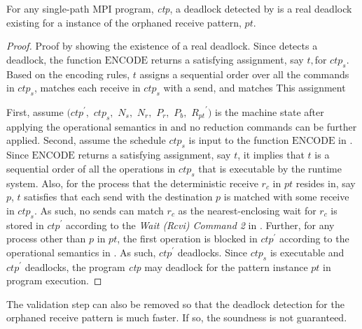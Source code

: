 \begin{lemma}
For any single-path MPI program, \textit{ctp}, a deadlock detected by  is a real deadlock existing for a instance of the orphaned receive pattern, $\mathit{pt}$. 
\label{lemma:mismatch}
\end{lemma}
\begin{proof}
Proof by showing the existence of a real deadlock. Since  detects a deadlock, the function $\mathrm{ENCODE}$ returns a satisfying assignment, say $\mathit{t}, $for $ctp_s$. Based on the encoding rules, $\mathit{t}$ assigns a sequential order over all the commands in $ctp_s$, matches each receive in $ctp_s$ with a send, and matches 
This assignment 

First, assume $(\mathit{ctp}^\prime,$ $\mathit{ctp}_s,$ $\mathit{N_s},$ $\mathit{N_r},$ $\mathit{P_r},$ $\mathit{P_b},$ $\mathit{R_{pt}}^\prime)$ is the machine state after applying the operational semantics in  and no reduction commands can be further applied. Second, assume the schedule $\mathit{ctp}_s$ is input to the function $\mathrm{ENCODE}$ in . Since $\mathrm{ENCODE}$ returns a satisfying assignment, say $\mathit{t}$, it implies that $\mathit{t}$ is a sequential order of all the operations in $\mathit{ctp}_s$ that is executable by the runtime system. Also, for the process that the deterministic receive $\mathit{r_c}$ in $\mathit{pt}$ resides in, say $\mathit{p}$, $\mathit{t}$ satisfies that each send with the destination $\mathit{p}$ is matched with some receive in $\mathit{ctp}_s$. As such, no sends can match $\mathit{r_c}$ as the nearest-enclosing wait for $\mathit{r_c}$ is stored in $\mathit{ctp}^\prime$ according to the \emph{Wait (Rcvi) Command 2} in . Further, for any process other than $\mathit{p}$ in $\mathit{pt}$, the first operation is blocked in $\mathit{ctp}^\prime$ according to the operational semantics in . As such, $\mathit{ctp}^\prime$ deadlocks. Since $\mathit{ctp}_s$ is executable and $\mathit{ctp}^\prime$ deadlocks, the program \textit{ctp} may deadlock for the pattern instance $\mathit{pt}$ in program execution. 
\end{proof}

The validation step can also be removed so that the deadlock detection for the orphaned receive pattern is much faster. If so, the soundness is not guaranteed. 


